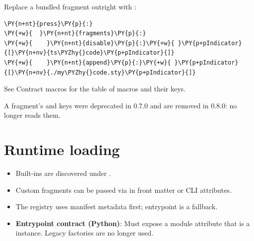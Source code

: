\documentclass[a4paper,twoside]{article}
\begin{document}
Replace a bundled fragment outright with :
\begin{tscode}[lang=yaml, engine=pygments]
\begin{Verbatim}[commandchars=\\\{\},breaklines, breakanywhere, commandchars=\\\{\}]
\PY{n+nt}{press}\PY{p}{:}
\PY{+w}{  }\PY{n+nt}{fragments}\PY{p}{:}
\PY{+w}{    }\PY{n+nt}{disable}\PY{p}{:}\PY{+w}{ }\PY{p+pIndicator}{[}\PY{n+nv}{ts\PYZhy{}code}\PY{p+pIndicator}{]}
\PY{+w}{    }\PY{n+nt}{append}\PY{p}{:}\PY{+w}{ }\PY{p+pIndicator}{[}\PY{n+nv}{./my\PYZhy{}code.sty}\PY{p+pIndicator}{]}
\end{Verbatim}
\end{tscode}
See Contract macros for the table of macros and
their keys.
\begin{tscallout}[kind=warning, title={Jinja partials are no longer the rendering layer}]
A fragment's  and  keys were deprecated in
0.7.0 and are removed in 0.8.0:  no longer reads them.
\end{tscallout}
\section{Runtime loading}
\begin{itemize}
\item Built-ins are discovered under .
\item Custom fragments can be passed via  in front matter or CLI attributes.
\item The registry uses manifest metadata first; entrypoint is a fallback.
\item \textbf{Entrypoint contract (Python)}: Must expose a module attribute  that is a  instance. Legacy  factories are no longer used.
\end{itemize}
\end{document}
